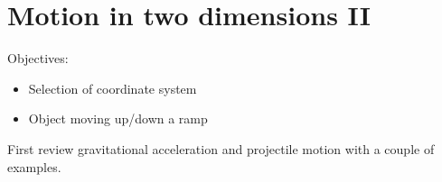 \section{Motion in two dimensions II}
Objectives:
\begin{itemize}
\item Selection of coordinate system
\item Object moving up/down a ramp
\end{itemize}

First review gravitational acceleration and projectile motion with a couple of examples.






